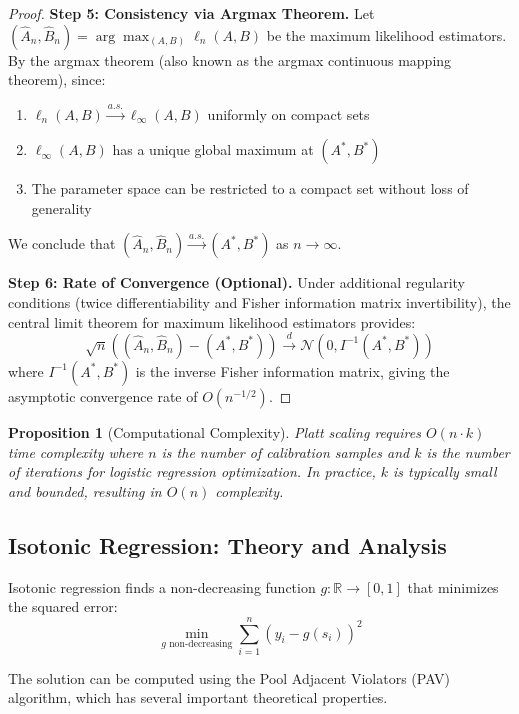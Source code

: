 \documentclass[12pt, a4paper]{article}
\newtheorem{proposition}{Proposition}
\begin{document}
\begin{proof}
\textbf{Step 5: Consistency via Argmax Theorem.}
Let $(\hat{A}_n, \hat{B}_n) = \arg\max_{(A,B)} \ell_n(A,B)$ be the maximum likelihood estimators. By the argmax theorem (also known as the argmax continuous mapping theorem), since:
\begin{enumerate}
    \item $\ell_n(A,B) \xrightarrow{a.s.} \ell_\infty(A,B)$ uniformly on compact sets
    \item $\ell_\infty(A,B)$ has a unique global maximum at $(A^*, B^*)$
    \item The parameter space can be restricted to a compact set without loss of generality
\end{enumerate}

We conclude that $(\hat{A}_n, \hat{B}_n) \xrightarrow{a.s.} (A^*, B^*)$ as $n \to \infty$.

\textbf{Step 6: Rate of Convergence (Optional).}
Under additional regularity conditions (twice differentiability and Fisher information matrix invertibility), the central limit theorem for maximum likelihood estimators provides:
$$\sqrt{n}((\hat{A}_n, \hat{B}_n) - (A^*, B^*)) \xrightarrow{d} \mathcal{N}(0, I^{-1}(A^*, B^*))$$
where $I^{-1}(A^*, B^*)$ is the inverse Fisher information matrix, giving the asymptotic convergence rate of $O(n^{-1/2})$.
\end{proof}

\begin{proposition}[Computational Complexity]
Platt scaling requires $O(n \cdot k)$ time complexity where $n$ is the number of calibration samples and $k$ is the number of iterations for logistic regression optimization. In practice, $k$ is typically small and bounded, resulting in $O(n)$ complexity.
\end{proposition}

\subsection{Isotonic Regression: Theory and Analysis}

Isotonic regression finds a non-decreasing function $g: \mathbb{R} \to [0,1]$ that minimizes the squared error:
\begin{equation}
\min_{g \text{ non-decreasing}} \sum_{i=1}^{n} (y_i - g(s_i))^2
\end{equation}

The solution can be computed using the Pool Adjacent Violators (PAV) algorithm, which has several important theoretical properties.
\end{document}

